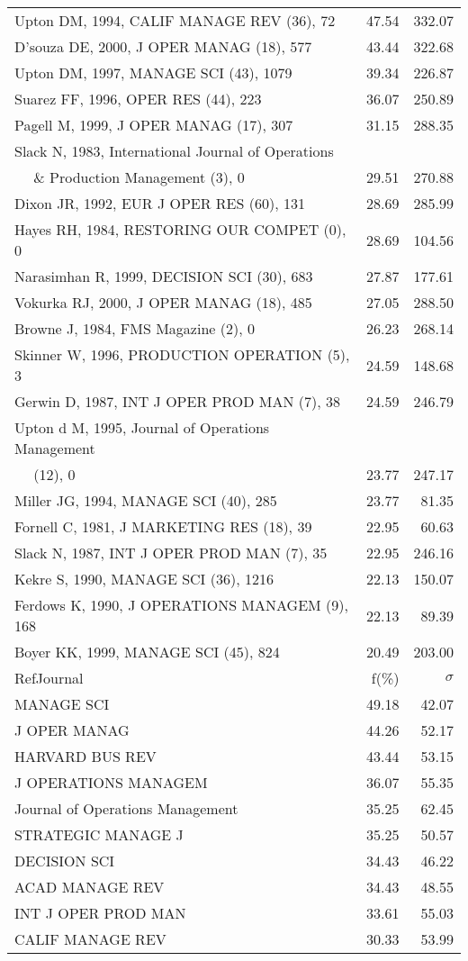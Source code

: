 \documentclass[a4paper,11pt]{report}
\begin{document}
\begin{landscape}
\begin{table}[!ht]
{\begin{tabular}{|l r r|}
Upton DM, 1994, CALIF MANAGE REV (36), 72 & 47.54 & 332.07\\
D'souza DE, 2000, J OPER MANAG (18), 577 & 43.44 & 322.68\\
Upton DM, 1997, MANAGE SCI (43), 1079 & 39.34 & 226.87\\
Suarez FF, 1996, OPER RES (44), 223 & 36.07 & 250.89\\
Pagell M, 1999, J OPER MANAG (17), 307 & 31.15 & 288.35\\
Slack N, 1983, International Journal of Operations &  & \\
$\quad$ \& Production Management (3), 0 & 29.51 & 270.88\\
Dixon JR, 1992, EUR J OPER RES (60), 131 & 28.69 & 285.99\\
Hayes RH, 1984, RESTORING OUR COMPET (0), 0 & 28.69 & 104.56\\
Narasimhan R, 1999, DECISION SCI (30), 683 & 27.87 & 177.61\\
Vokurka RJ, 2000, J OPER MANAG (18), 485 & 27.05 & 288.50\\
Browne J, 1984, FMS Magazine (2), 0 & 26.23 & 268.14\\
Skinner W, 1996, PRODUCTION OPERATION (5), 3 & 24.59 & 148.68\\
Gerwin D, 1987, INT J OPER PROD MAN (7), 38 & 24.59 & 246.79\\
Upton d M, 1995, Journal of Operations Management &  & \\
$\quad$ (12), 0 & 23.77 & 247.17\\
Miller JG, 1994, MANAGE SCI (40), 285 & 23.77 & 81.35\\
Fornell C, 1981, J MARKETING RES (18), 39 & 22.95 & 60.63\\
Slack N, 1987, INT J OPER PROD MAN (7), 35 & 22.95 & 246.16\\
Kekre S, 1990, MANAGE SCI (36), 1216 & 22.13 & 150.07\\
Ferdows K, 1990, J OPERATIONS MANAGEM (9), 168 & 22.13 & 89.39\\
Boyer KK, 1999, MANAGE SCI (45), 824 & 20.49 & 203.00\\
\hline
\hline
RefJournal & f(\%) & $\sigma$\\
\hline
MANAGE SCI & 49.18 & 42.07\\
J OPER MANAG & 44.26 & 52.17\\
HARVARD BUS REV & 43.44 & 53.15\\
J OPERATIONS MANAGEM & 36.07 & 55.35\\
Journal of Operations Management & 35.25 & 62.45\\
STRATEGIC MANAGE J & 35.25 & 50.57\\
DECISION SCI & 34.43 & 46.22\\
ACAD MANAGE REV & 34.43 & 48.55\\
INT J OPER PROD MAN & 33.61 & 55.03\\
CALIF MANAGE REV & 30.33 & 53.99\\
\hline
\end{tabular}
}
\end{table}


\end{landscape}
\end{document}
